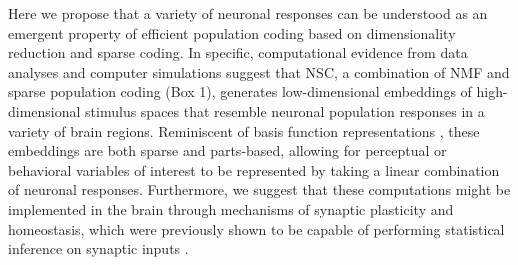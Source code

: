 Here we propose that a variety of neuronal responses
can be understood as an emergent property of efficient population coding
based on dimensionality reduction and sparse coding.
In specific, computational evidence from data analyses and computer simulations
suggest that \ac{NSC},
a combination of \ac{NMF} \citep{PaateroTapper1994,LeeSeung1999}
and sparse population coding \citep{Field1994} (Box 1),
generates low-dimensional embeddings of 
high-dimensional stimulus spaces 
that resemble neuronal population responses 
in a variety of brain regions.
Reminiscent of basis function representations
\citep{PougetSejnowski1997,PougetSnyder2000,Poggio1990},
these embeddings are both sparse and parts-based,
allowing for perceptual or behavioral variables of interest
to be represented by taking a linear combination of neuronal responses.
Furthermore, we suggest that these computations might be implemented in the brain
through mechanisms of synaptic plasticity and homeostasis,
which were previously shown to be capable of
performing statistical inference on synaptic inputs
\citep{Nessler2009,Carlson2013,MorenoBoteDrugowitsch2015,Oja1982}.

